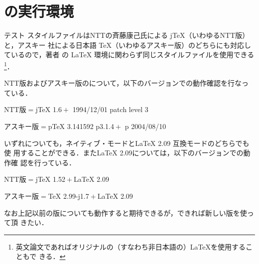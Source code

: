 \section{{\protect\LATex}の実行環境}\label{sec:ITEM}
テスト
スタイルファイルはNTTの斉藤康己氏による j{\TeX}（いわゆるNTT版）と，アスキー
社による日本語 {\TeX}（いわゆるアスキー版）のどちらにも対応しているので，著者
の {\LaTeX} 環境に関わらず同じスタイルファイルを使用できる\footnote{%
%
英文論文であればオリジナルの（すなわち非日本語の）{\LaTeX}を使用することもで
きる．}．

NTT版およびアスキー版の{\LATEXe}について，以下のバージョンでの動作確認を行なっ
ている．
%
\begin{ITEMIZE}%
\item
NTT版${}={}${j\TeX} 1.6${}+{}$%
	{\LATEXe} 1994/12/01 patch level 3
\item 
アスキー版${}={}${p\TeX} 3.141592 p3.1.4${}+{}$%
	{p\LATEXe} 2004/08/10
\end{ITEMIZE}%
%
いずれについても，ネイティブ・モードと{\LaTeX} 2.09 互換モードのどちらでも使
用することができる．また{\LaTeX} 2.09については，以下のバージョンでの動作確
認を行っている．
%
\begin{ITEMIZE}%
\item
NTT版${}={}${j\TeX} 1.52${}+{}${\LaTeX} 2.09
\item 
アスキー版${}={}${\TeX} 2.99-j1.7${}+{}${\LaTeX} 2.09
\end{ITEMIZE}%
%
なお上記以前の版についても動作すると期待できるが，できれば新しい版を使って頂
きたい．

